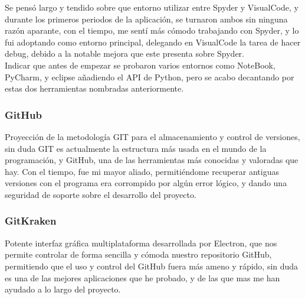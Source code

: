 Se pensó largo y tendido sobre que entorno utilizar entre Spyder y VisualCode, y durante los primeros periodos de la aplicación, se turnaron ambos sin ninguna razón aparante, con el tiempo, me sentí más cómodo trabajando con Spyder, y lo fui adoptando como entorno principal, delegando en VisualCode la tarea de hacer debug, debido a la notable mejora que este presenta sobre Spyder.\\

Indicar que antes de empezar se probaron varios entornos como NoteBook, PyCharm, y eclipse añadiendo el API de Python, pero se acabo decantando por estas dos herramientas nombradas anteriormente.\\

\subsubsection{GitHub}
Proyección de la metodología GIT para el almacenamiento y control de versiones, sin duda GIT es actualmente la estructura más usada en el mundo de la programación, y GitHub, una de las herramientas más conocidas y valoradas que hay.  Con el tiempo, fue mi mayor aliado, permitiéndome recuperar antiguas versiones con el programa era corrompido por algún error lógico, y dando una seguridad de soporte sobre el desarrollo del proyecto.
\subsubsection{GitKraken}
Potente interfaz gráfica multiplataforma desarrollada por Electron, que nos permite controlar de forma sencilla y cómoda nuestro repositorio GitHub, permitiendo que el uso y control del GitHub fuera más ameno y rápido, sin duda es una de las mejores aplicaciones que he probado, y de las que mas me han ayudado a lo largo del proyecto.


